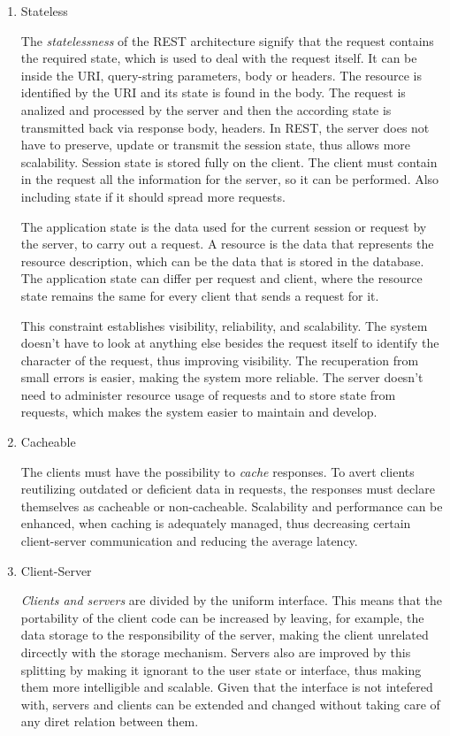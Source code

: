 \begin{enumerate}[label=\arabic*)]
  \item Stateless

    The \textit{statelessness} of the REST architecture signify that the request contains the required state, which is used to deal with the request itself.
    It can be inside the URI, query-string parameters, body or headers. The resource is identified by the URI and its state is found in the body. The request is analized and processed by the server and then the according state is transmitted back via response body, headers.
    In REST, the server does not have to preserve, update or transmit the session state, thus allows more scalability. Session state is stored fully on the client. The client must contain in the request all the information for the server, so it can be performed. Also including state if it should spread more requests.

    The application state is the data used for the current session or request by the server, to carry out a request. A resource is the data that represents the resource description, which can be the data that is stored in the database. The application state can differ per request and client, where the resource state remains the same for every client that sends a request for it.

    This constraint establishes visibility, reliability, and scalability. The system doesn't have to look at anything else besides the request itself to identify the character of the request, thus improving visibility. The recuperation from small errors is easier, making the system more reliable. The server doesn't need to administer resource usage of requests and to store state from requests, which makes the system easier to maintain and develop.

  \item Cacheable

    The clients must have the possibility to \textit{cache} responses. To avert clients reutilizing outdated or deficient data in requests, the responses must declare themselves as cacheable or non-cacheable. Scalability and performance can be enhanced, when caching is adequately managed, thus decreasing certain client-server communication and reducing the average latency. 

  \item Client-Server

    \textit{Clients and servers} are divided by the uniform interface. This means that the portability of the client code can be increased by leaving, for example, the data storage to the responsibility of the server, making the client unrelated dircectly with the storage mechanism. Servers also are improved by this splitting by making it ignorant to the user state or interface, thus making them more intelligible and scalable. Given that the interface is not intefered with, servers and clients can be extended and changed without taking care of any diret relation between them.


\end{enumerate}
